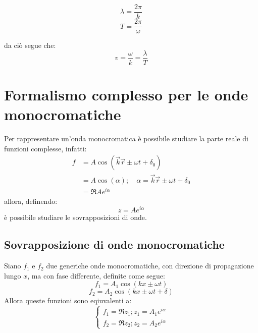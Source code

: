 \documentclass[11pt, a4paper, openright]{book}
\theoremstyle{plain}
\theoremstyle{definition}
\begin{document}
\begin{equation}
    \lambda = \frac{2\pi}{k}
    \label{eq:lunghezzaOnda}
\end{equation}
\begin{equation}
    T = \frac{2\pi}{\omega}
    \label{eq:periodoTemporale}
\end{equation}

da ciò segue che:
\begin{equation}
    v = \frac{\omega}{k} = \frac{\lambda}{T}
\end{equation}

\section{Formalismo complesso per le onde monocromatiche}
Per rappresentare un'onda monocromatica è possibile studiare la parte reale di funzioni complesse, infatti:
\begin{align}
    f & = A\cos(\vec{k}\vec{r} \pm \omega t + \delta_0) \\
      & = A\cos(\alpha); \quad \alpha = \vec{k}\vec{r} \pm \omega t + \delta_0 \\
      & = \Re{Ae^{i\alpha}}
\end{align}
allora, definendo:
\begin{equation}
    z = Ae^{i\alpha}
\end{equation}
è possibile studiare le sovrapposizioni di onde.

\subsection{Sovrapposizione di onde monocromatiche}
Siano $f_1$ e $f_2$ due generiche onde monocromatiche, con direzione di propagazione lungo $x$, ma con fase differente, definite come segue:
\begin{equation}
    f_1 = A_1\cos(kx \pm \omega t)
\end{equation}
\begin{equation}
    f_2 = A_2\cos(kx \pm \omega t + \delta)
\end{equation}
Allora queste funzioni sono eqiuvalenti a:
\begin{equation}
    \begin{cases}
        f_1 = \Re{z_1}; z_1 = A_1e^{i\alpha} \\
        f_2 = \Re{z_2}; z_2 = A_2e^{i\alpha}
    \end{cases}
\end{equation}
\end{document}
